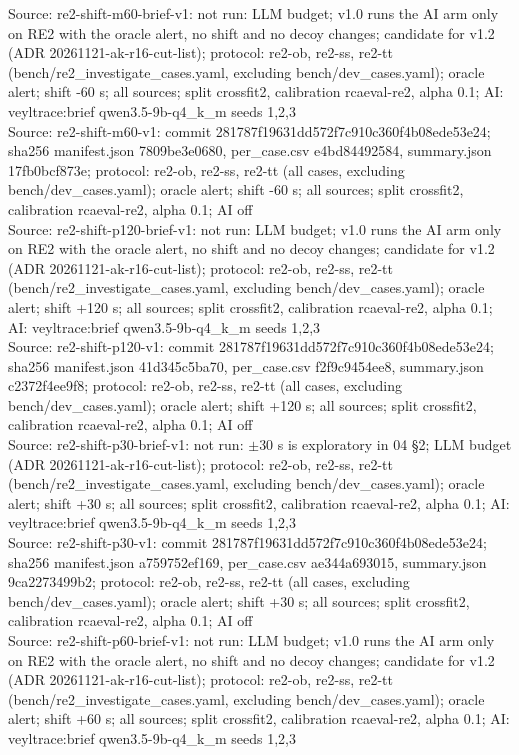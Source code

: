 \begin{table}[t]
Source: re2-shift-m60-brief-v1: not run: LLM budget; v1.0 runs the AI arm only on RE2 with the oracle alert, no shift and no decoy changes; candidate for v1.2 (ADR 20261121-ak-r16-cut-list); protocol: re2-ob, re2-ss, re2-tt (bench/re2\_investigate\_cases.yaml, excluding bench/dev\_cases.yaml); oracle alert; shift -60 s; all sources; split crossfit2, calibration rcaeval-re2, alpha 0.1; AI: veyltrace:brief qwen3.5-9b-q4\_k\_m seeds 1,2,3\\
Source: re2-shift-m60-v1: commit 281787f19631dd572f7c910c360f4b08ede53e24; sha256 manifest.json 7809be3e0680, per\_case.csv e4bd84492584, summary.json 17fb0bcf873e; protocol: re2-ob, re2-ss, re2-tt (all cases, excluding bench/dev\_cases.yaml); oracle alert; shift -60 s; all sources; split crossfit2, calibration rcaeval-re2, alpha 0.1; AI off\\
Source: re2-shift-p120-brief-v1: not run: LLM budget; v1.0 runs the AI arm only on RE2 with the oracle alert, no shift and no decoy changes; candidate for v1.2 (ADR 20261121-ak-r16-cut-list); protocol: re2-ob, re2-ss, re2-tt (bench/re2\_investigate\_cases.yaml, excluding bench/dev\_cases.yaml); oracle alert; shift +120 s; all sources; split crossfit2, calibration rcaeval-re2, alpha 0.1; AI: veyltrace:brief qwen3.5-9b-q4\_k\_m seeds 1,2,3\\
Source: re2-shift-p120-v1: commit 281787f19631dd572f7c910c360f4b08ede53e24; sha256 manifest.json 41d345c5ba70, per\_case.csv f2f9c9454ee8, summary.json c2372f4ee9f8; protocol: re2-ob, re2-ss, re2-tt (all cases, excluding bench/dev\_cases.yaml); oracle alert; shift +120 s; all sources; split crossfit2, calibration rcaeval-re2, alpha 0.1; AI off\\
Source: re2-shift-p30-brief-v1: not run: $\pm$30 s is exploratory in 04 \S{}2; LLM budget (ADR 20261121-ak-r16-cut-list); protocol: re2-ob, re2-ss, re2-tt (bench/re2\_investigate\_cases.yaml, excluding bench/dev\_cases.yaml); oracle alert; shift +30 s; all sources; split crossfit2, calibration rcaeval-re2, alpha 0.1; AI: veyltrace:brief qwen3.5-9b-q4\_k\_m seeds 1,2,3\\
Source: re2-shift-p30-v1: commit 281787f19631dd572f7c910c360f4b08ede53e24; sha256 manifest.json a759752ef169, per\_case.csv ae344a693015, summary.json 9ca2273499b2; protocol: re2-ob, re2-ss, re2-tt (all cases, excluding bench/dev\_cases.yaml); oracle alert; shift +30 s; all sources; split crossfit2, calibration rcaeval-re2, alpha 0.1; AI off\\
Source: re2-shift-p60-brief-v1: not run: LLM budget; v1.0 runs the AI arm only on RE2 with the oracle alert, no shift and no decoy changes; candidate for v1.2 (ADR 20261121-ak-r16-cut-list); protocol: re2-ob, re2-ss, re2-tt (bench/re2\_investigate\_cases.yaml, excluding bench/dev\_cases.yaml); oracle alert; shift +60 s; all sources; split crossfit2, calibration rcaeval-re2, alpha 0.1; AI: veyltrace:brief qwen3.5-9b-q4\_k\_m seeds 1,2,3\\

\end{table}
